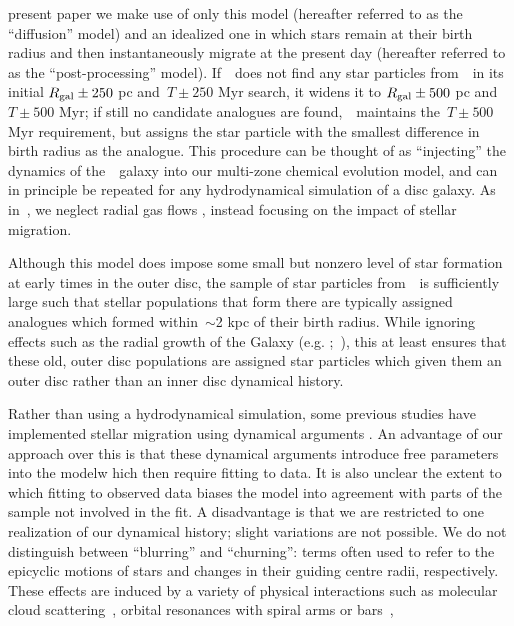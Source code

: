 \documentclass[ms.tex]{subfiles}
\begin{document}
present paper we make use of only this model (hereafter referred to as the
``diffusion'' model) and an idealized one in which stars remain at their birth
radius and then instantaneously migrate at the present day (hereafter referred
to as the ``post-processing'' model).
If~\vice~does not find any star particles from~\hsim~in its initial
$R_\text{gal} \pm 250$ pc and~$T \pm 250$ Myr search, it widens it to
$R_\text{gal} \pm 500$ pc and~$T \pm 500$ Myr; if still no candidate analogues are
found,~\vice~maintains the~$T \pm 500$ Myr requirement, but assigns the star
particle with the smallest difference in birth radius as the analogue.
This procedure can be thought of as ``injecting'' the dynamics of
the~\hsim~galaxy into our multi-zone chemical evolution model, and can in
principle be repeated for any hydrodynamical simulation of a disc galaxy.
As in~\citet{Johnson2021}, we neglect radial gas flows
\citep[e.g.][]{Lacey1985, Bilitewski2012, Vincenzo2020}, instead focusing on
the impact of stellar migration.
\par
Although this model does impose some small but nonzero level of star formation
at early times in the outer disc, the sample of star particles from~\hsim~is
sufficiently large such that stellar populations that form there are typically
assigned analogues which formed within~$\sim$2 kpc of their birth radius.
While ignoring effects such as the radial growth of the Galaxy (e.g.
\citealp*{Bird2012};~\citealp{Bird2013}), this at least ensures that these old,
outer disc populations are assigned star particles which given them an outer
disc rather than an inner disc dynamical history.
\par
Rather than using a hydrodynamical simulation, some previous studies have
implemented stellar migration using dynamical arguments
\citep[e.g.][]{Schoenrich2009, Sharma2021}.
An advantage of our approach over this is that these dynamical arguments
introduce free parameters into the modelw hich then require fitting to data.
It is also unclear the extent to which fitting to observed data biases the
model into agreement with parts of the sample not involved in the fit.
A disadvantage is that we are restricted to one realization of our dynamical
history; slight variations are not possible.
We do not distinguish between ``blurring'' and ``churning'': terms often used
to refer to the epicyclic motions of stars and changes in their guiding centre
radii, respectively.
These effects are induced by a variety of physical interactions such as
molecular cloud scattering~\citep{Mihalas1981, Jenkins1990, Jenkins1992},
orbital resonances with spiral arms or bars~\citep{Sellwood2002, Minchev2011},
\end{document}
